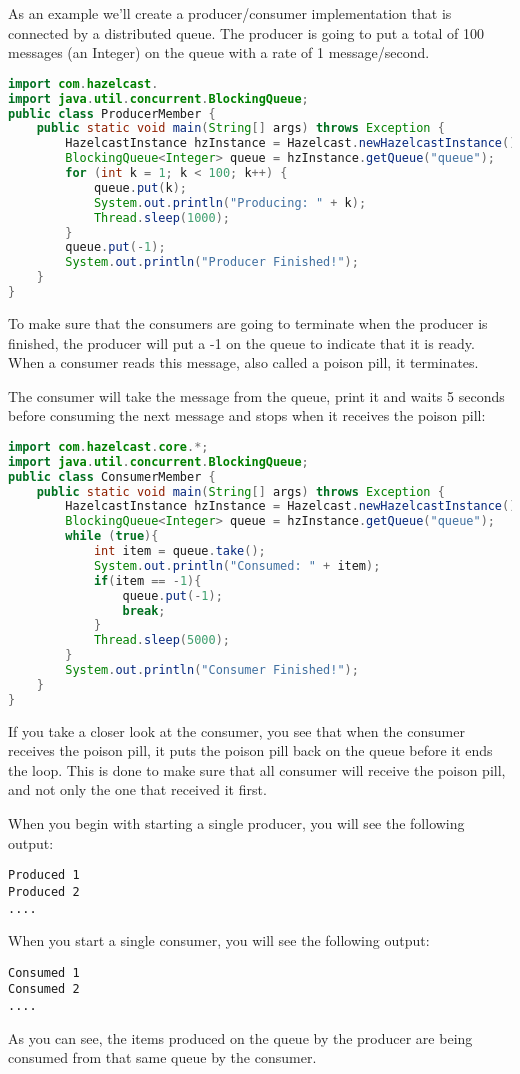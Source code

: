 As an example we'll create a producer/consumer implementation that is connected by a distributed queue. The producer is going to put a total of 100 messages (an Integer) on the queue with a rate of 1 message/second.
\begin{lstlisting}[language=java]
import com.hazelcast.
import java.util.concurrent.BlockingQueue;
public class ProducerMember {
    public static void main(String[] args) throws Exception {
        HazelcastInstance hzInstance = Hazelcast.newHazelcastInstance();
        BlockingQueue<Integer> queue = hzInstance.getQueue("queue");
        for (int k = 1; k < 100; k++) {
            queue.put(k);
            System.out.println("Producing: " + k);
            Thread.sleep(1000);
        }
        queue.put(-1);
        System.out.println("Producer Finished!");
    }
}
\end{lstlisting}
To make sure that the consumers are going to terminate when the producer is finished, the producer will put a -1 on the queue to indicate that it is ready. When a consumer reads this message, also called a poison pill, it terminates. 

The consumer will take the message from the queue, print it and waits 5 seconds before consuming the next message and stops when it receives the poison pill:
\begin{lstlisting}[language=java]
import com.hazelcast.core.*;
import java.util.concurrent.BlockingQueue;
public class ConsumerMember {
    public static void main(String[] args) throws Exception {
        HazelcastInstance hzInstance = Hazelcast.newHazelcastInstance();
        BlockingQueue<Integer> queue = hzInstance.getQueue("queue");
        while (true){
            int item = queue.take();
            System.out.println("Consumed: " + item);
            if(item == -1){
                queue.put(-1);
                break;
            }     
            Thread.sleep(5000);            
        }
        System.out.println("Consumer Finished!");
    }
}
\end{lstlisting}
If you take a closer look at the consumer, you see that when the consumer receives the poison pill, it puts the poison pill back on the queue before it ends the loop. This is done to make sure that all consumer will receive the poison pill, and not only the one that received it first.

When you begin with starting a single producer, you will see the following output:
\begin{lstlisting}
Produced 1
Produced 2
....
\end{lstlisting}
When you start a single consumer, you will see the following output:
\begin{lstlisting}
Consumed 1
Consumed 2
....
\end{lstlisting}
As you can see, the items produced on the queue by the producer are being consumed from that same queue by the consumer. 

